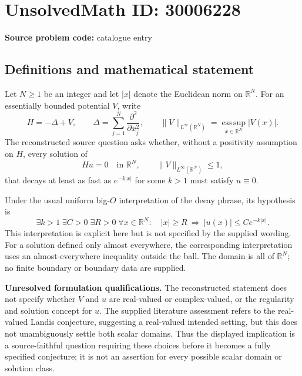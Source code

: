 \documentclass[11pt]{article}
\newcommand{\R}{\mathbb{R}}
\begin{document}
\section*{UnsolvedMath ID: 30006228}
\textbf{Source problem code:} catalogue entry
\subsection{Definitions and mathematical statement}
Let \(N\geq 1\) be an integer and let \(|x|\) denote the Euclidean norm on \(\R^N\). For an essentially bounded potential \(V\), write
\[
H=-\Delta+V,\qquad \Delta=\sum_{j=1}^{N}\frac{\partial^2}{\partial x_j^2},\qquad
\|V\|_{L^\infty(\R^N)}=\operatorname*{ess\,sup}_{x\in\R^N}|V(x)|.
\]
The reconstructed source question asks whether, without a positivity assumption on \(H\), every solution of
\[
Hu=0\quad\text{in }\R^N,\qquad \|V\|_{L^\infty(\R^N)}\leq 1,
\]
that decays at least as fast as \(e^{-k|x|}\) for some \(k>1\) must satisfy \(u\equiv0\).

Under the usual uniform big-\(O\) interpretation of the decay phrase, its hypothesis is
\[
\exists k>1\;\exists C>0\;\exists R>0\;\forall x\in\R^N:
\quad |x|\geq R\ \Longrightarrow\ |u(x)|\leq C e^{-k|x|}.
\]
This interpretation is explicit here but is not specified by the supplied wording. For a solution defined only almost everywhere, the corresponding interpretation uses an almost-everywhere inequality outside the ball. The domain is all of \(\R^N\); no finite boundary or boundary data are supplied.

\textbf{Unresolved formulation qualifications.} The reconstructed statement does not specify whether \(V\) and \(u\) are real-valued or complex-valued, or the regularity and solution concept for \(u\). The supplied literature assessment refers to the real-valued Landis conjecture, suggesting a real-valued intended setting, but this does not unambiguously settle both scalar domains. Thus the displayed implication is a source-faithful question requiring these choices before it becomes a fully specified conjecture; it is not an assertion for every possible scalar domain or solution class.
\end{document}
